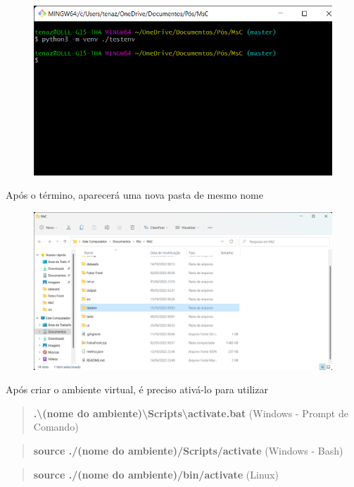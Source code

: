 \documentclass[portugues]{ic-tese}
\begin{document}
\begin{figure}[H]
\centering
\includegraphics[scale=0.4]{images/doc-install/virtualenv-sh.png}
\label{fig:DocInstallVirtualEnvShell}
\end{figure}

Após o término, aparecerá uma nova pasta de mesmo nome

\begin{figure}[H]
\centering
\includegraphics[scale=0.25]{images/doc-install/virtualenv.png}
\label{fig:DocInstallVirtualEnvFolder}
\end{figure}

Após criar o ambiente virtual, é preciso ativá-lo para utilizar

\begin{quote}
\textbf{.\textbackslash (nome do ambiente)\textbackslash Scripts\textbackslash activate.bat} (Windows - Prompt de Comando)
\end{quote}
\begin{quote}
\textbf{source ./(nome do ambiente)/Scripts/activate} (Windows - Bash)
\end{quote}
\begin{quote}
\textbf{source ./(nome do ambiente)/bin/activate} (Linux)
\end{quote}
\end{document}
